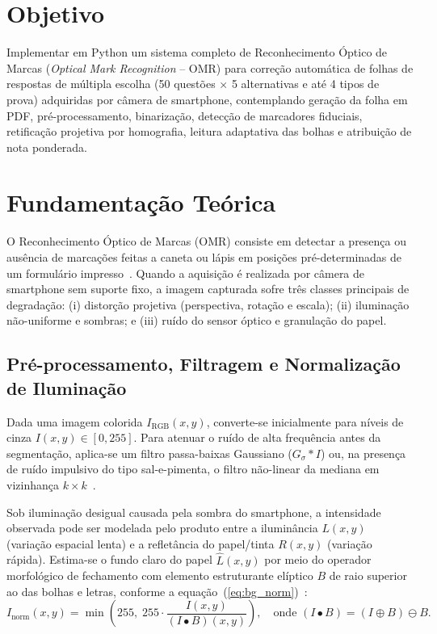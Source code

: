 \documentclass[11pt]{article}
\date{nov.2026}
\begin{document}
\maketitle

\section{Objetivo}

Implementar em Python um sistema completo de Reconhecimento Óptico de Marcas (\textit{Optical Mark Recognition} -- OMR) para correção automática de folhas de respostas de múltipla escolha (50 questões $\times$ 5 alternativas e até 4 tipos de prova) adquiridas por câmera de smartphone, contemplando geração da folha em PDF, pré-processamento, binarização, detecção de marcadores fiduciais, retificação projetiva por homografia, leitura adaptativa das bolhas e atribuição de nota ponderada.

\section{Fundamentação Teórica}

O Reconhecimento Óptico de Marcas (OMR) consiste em detectar a presença ou ausência de marcações feitas a caneta ou lápis em posições pré-determinadas de um formulário impresso~\cite{gonzalez2018}. Quando a aquisição é realizada por câmera de smartphone sem suporte fixo, a imagem capturada sofre três classes principais de degradação: (i) distorção projetiva (perspectiva, rotação e escala); (ii) iluminação não-uniforme e sombras; e (iii) ruído do sensor óptico e granulação do papel.

\subsection{Pré-processamento, Filtragem e Normalização de Iluminação}

Dada uma imagem colorida $I_{\text{RGB}}(x,y)$, converte-se inicialmente para níveis de cinza $I(x,y) \in [0, 255]$. Para atenuar o ruído de alta frequência antes da segmentação, aplica-se um filtro passa-baixas Gaussiano ($G_\sigma * I$) ou, na presença de ruído impulsivo do tipo sal-e-pimenta, o filtro não-linear da mediana em vizinhança $k \times k$~\cite{gonzalez2018}.

Sob iluminação desigual causada pela sombra do smartphone, a intensidade observada pode ser modelada pelo produto entre a iluminância $L(x,y)$ (variação espacial lenta) e a refletância do papel/tinta $R(x,y)$ (variação rápida). Estima-se o fundo claro do papel $\hat{L}(x,y)$ por meio do operador morfológico de fechamento com elemento estruturante elíptico $B$ de raio superior ao das bolhas e letras, conforme a equação~(\ref{eq:bg_norm})~\cite{gonzalez2018}:
\begin{equation} \label{eq:bg_norm}
I_{\text{norm}}(x,y) = \min\!\left(255,\; 255 \cdot \frac{I(x,y)}{(I \bullet B)(x,y)}\right), \quad \text{onde } (I \bullet B) = (I \oplus B) \ominus B.
\end{equation}
\end{document}
